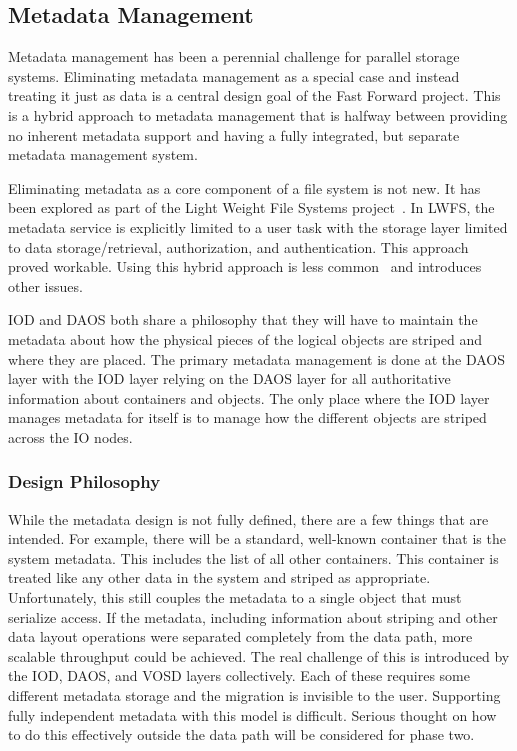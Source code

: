 \documentclass[conference]{IEEEtran} \pdfpagewidth=8.5in
\begin{document}
\subsection{Metadata Management}
Metadata management has been a perennial challenge for parallel storage
systems.  Eliminating metadata management as a special case and instead
treating it just as data is a central design goal of the Fast Forward project.
This is a hybrid approach to metadata management that is halfway between
providing no inherent metadata support and having a fully integrated, but
separate metadata management system.

Eliminating metadata as a core component of a file system is not new. It has
been explored as part of the Light Weight File Systems
project~\cite{oldfield:lwfs}. In LWFS, the metadata service is explicitly
limited to a user task with the storage layer limited to data
storage/retrieval, authorization, and authentication. This approach proved
workable. Using this hybrid approach is less common~\cite{weil:2006:ceph} and
introduces other issues.

IOD and DAOS both share a philosophy that they will have to maintain the
metadata about how the physical pieces of the logical objects are striped and
where they are placed. The primary metadata management is done at the DAOS
layer with the IOD layer relying on the DAOS layer for all authoritative
information about containers and objects. The only place where the IOD layer
manages metadata for itself is to manage how the different objects are striped
across the IO nodes.

\subsubsection{Design Philosophy}

While the metadata design is not fully defined, there are a few things that
are intended. For example, there will be a standard, well-known container that
is the system metadata. This includes the list of all other containers. This
container is treated like any other data in the system and striped as
appropriate. Unfortunately, this still couples the metadata to a single object
that must serialize access. If the metadata, including information about
striping and other data layout operations were separated completely from the
data path, more scalable throughput could be achieved. The real challenge of
this is introduced by the IOD, DAOS, and VOSD layers collectively. Each of
these requires some different metadata storage and the migration is invisible
to the user.  Supporting fully independent metadata with this model is
difficult. Serious thought on how to do this effectively outside the data path
will be considered for phase two.
\end{document}
